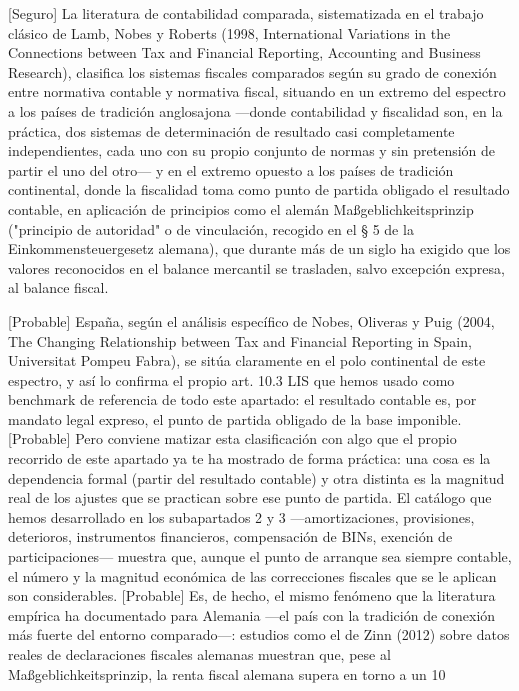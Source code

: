 \documentclass[10pt,a4paper]{article}
\begin{document}
[Seguro] La literatura de contabilidad comparada, sistematizada en el trabajo clásico de Lamb, Nobes y Roberts (1998, International Variations in the Connections between Tax and Financial Reporting, Accounting and Business Research), clasifica los sistemas fiscales comparados según su grado de conexión entre normativa contable y normativa fiscal, situando en un extremo del espectro a los países de tradición anglosajona —donde contabilidad y fiscalidad son, en la práctica, dos sistemas de determinación de resultado casi completamente independientes, cada uno con su propio conjunto de normas y sin pretensión de partir el uno del otro— y en el extremo opuesto a los países de tradición continental, donde la fiscalidad toma como punto de partida obligado el resultado contable, en aplicación de principios como el alemán Maßgeblichkeitsprinzip ("principio de autoridad" o de vinculación, recogido en el § 5 de la Einkommensteuergesetz alemana), que durante más de un siglo ha exigido que los valores reconocidos en el balance mercantil se trasladen, salvo excepción expresa, al balance fiscal.

[Probable] España, según el análisis específico de Nobes, Oliveras y Puig (2004, The Changing Relationship between Tax and Financial Reporting in Spain, Universitat Pompeu Fabra), se sitúa claramente en el polo continental de este espectro, y así lo confirma el propio art. 10.3 LIS que hemos usado como benchmark de referencia de todo este apartado: el resultado contable es, por mandato legal expreso, el punto de partida obligado de la base imponible. [Probable] Pero conviene matizar esta clasificación con algo que el propio recorrido de este apartado ya te ha mostrado de forma práctica: una cosa es la dependencia formal (partir del resultado contable) y otra distinta es la magnitud real de los ajustes que se practican sobre ese punto de partida. El catálogo que hemos desarrollado en los subapartados 2 y 3 —amortizaciones, provisiones, deterioros, instrumentos financieros, compensación de BINs, exención de participaciones— muestra que, aunque el punto de arranque sea siempre contable, el número y la magnitud económica de las correcciones fiscales que se le aplican son considerables. [Probable] Es, de hecho, el mismo fenómeno que la literatura empírica ha documentado para Alemania —el país con la tradición de conexión más fuerte del entorno comparado—: estudios como el de Zinn (2012) sobre datos reales de declaraciones fiscales alemanas muestran que, pese al Maßgeblichkeitsprinzip, la renta fiscal alemana supera en torno a un 10%
\end{document}
